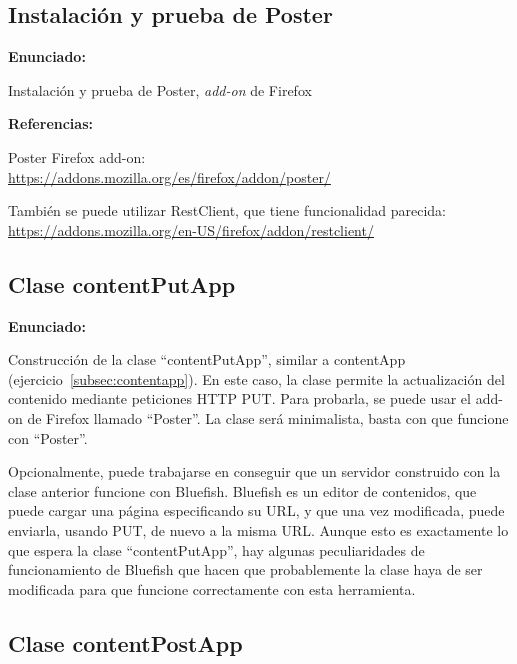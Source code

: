 \subsection{Instalación y prueba de Poster}
\label{subsec:inst-poster}

\textbf{Enunciado:}

Instalación y prueba de Poster, \emph{add-on} de Firefox

\textbf{Referencias:}

Poster Firefox add-on: \\
\url{https://addons.mozilla.org/es/firefox/addon/poster/}

También se puede utilizar RestClient, que tiene funcionalidad parecida: \\
\url{https://addons.mozilla.org/en-US/firefox/addon/restclient/}

\subsection{Clase contentPutApp}
\label{subsec:contentputapp}

\textbf{Enunciado:}

Construcción de la clase ``contentPutApp'', similar a contentApp (ejercicio~\ref{subsec:contentapp}). En este caso, la clase permite la actualización del contenido mediante peticiones HTTP PUT. Para probarla, se puede usar el add-on de Firefox llamado ``Poster''. La clase será minimalista, basta con que funcione con ``Poster''.

Opcionalmente, puede trabajarse en conseguir que un servidor construido con la clase anterior funcione con Bluefish. Bluefish es un editor de contenidos, que puede cargar una página especificando su URL, y que una vez modificada, puede enviarla, usando PUT, de nuevo a la misma URL. Aunque esto es exactamente lo que espera la clase ``contentPutApp'', hay algunas peculiaridades de funcionamiento de Bluefish que hacen que probablemente la clase haya de ser modificada para que funcione correctamente con esta herramienta.

\subsection{Clase contentPostApp}
\label{subsec:contentpostapp}

